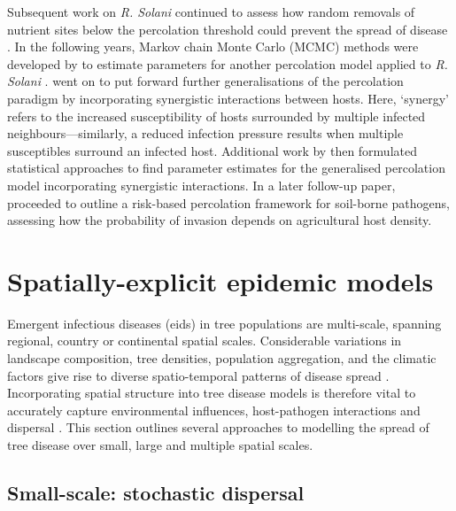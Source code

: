 Subsequent work on \textit{R. Solani} continued to assess how random removals of nutrient sites below the percolation threshold could prevent the spread of disease \cite{otten2004empirical}. In the following years, Markov chain Monte Carlo (MCMC) methods were developed by \cite{gibson2006bayesian} to estimate parameters for another percolation model applied to \textit{R. Solani} \cite{filipe2004inferring}. \cite{PhysRevLett.106.218701} went on to put forward further generalisations of the percolation paradigm by incorporating synergistic interactions between hosts. Here, `synergy' refers to the increased susceptibility of hosts surrounded by multiple infected neighbours—similarly, a reduced infection pressure results when multiple susceptibles surround an infected host. Additional work by \cite{ludlam2012applications} then formulated statistical approaches to find parameter estimates for the generalised percolation model incorporating synergistic interactions. In a later follow-up paper, \cite{poggi2013percolation} proceeded to outline a risk-based percolation framework for soil-borne pathogens, assessing how the probability of invasion depends on agricultural host density.  

\newpage

\section{Spatially-explicit epidemic models}
\label{ch2:lit-rev-compartmentalised-models}

Emergent infectious diseases (\acrshort{eid}s) in tree populations are multi-scale, spanning regional, country or continental spatial scales. Considerable variations in landscape composition,
tree densities, population aggregation, and the climatic factors give rise to diverse spatio-temporal
patterns of disease spread \cite{he2019integrating, suzuki2003spatial}. Incorporating spatial structure
into tree disease models is therefore vital to accurately capture environmental influences, host-pathogen 
interactions and dispersal \cite{liu2007characterizing}. This section outlines several approaches to modelling
the spread of tree disease over small, large and multiple spatial scales.

\subsection{Small-scale: stochastic dispersal}
\label{ch2:dispersal}

